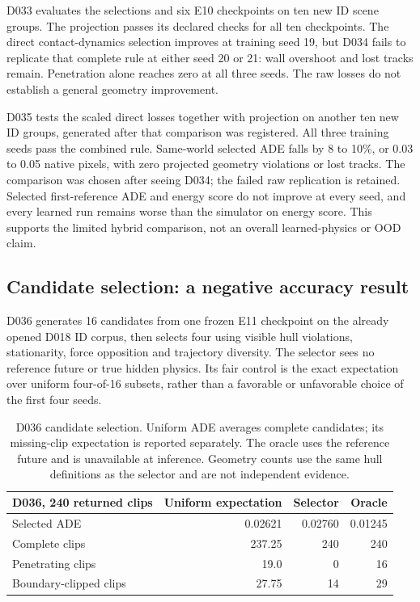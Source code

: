 D033 evaluates the selections and six E10 checkpoints on ten new ID scene
groups. The projection passes its declared checks for all ten checkpoints.
The direct contact-dynamics selection improves at training seed 19, but D034
fails to replicate that complete rule at either seed 20 or 21: wall overshoot
and lost tracks remain. Penetration alone reaches zero at all three seeds.
The raw losses do not establish a general geometry improvement.

D035 tests the scaled direct losses together with projection on another ten
new ID groups, generated after that comparison was registered. All three
training seeds pass the combined rule. Same-world selected ADE falls by
8 to 10\%, or 0.03 to 0.05 native pixels, with zero projected geometry violations
or lost tracks. The comparison was chosen after seeing D034; the failed raw
replication is retained. Selected first-reference ADE and energy score do not
improve at every seed, and every learned run remains worse than the simulator
on energy score. This supports the limited hybrid comparison, not an overall
learned-physics or OOD claim.

\subsection{Candidate selection: a negative accuracy result}
\label{sec:candidate-selection}
D036 generates 16 candidates from one frozen E11 checkpoint on the already
opened D018 ID corpus, then selects four using visible hull violations,
stationarity, force opposition and trajectory diversity. The selector sees no
reference future or true hidden physics. Its fair control is the exact
expectation over uniform four-of-16 subsets, rather than a favorable or
unfavorable choice of the first four seeds.

\begin{table}[!ht]
\centering
\begin{tabular}{lrrr}
\hline
D036, 240 returned clips & Uniform expectation & Selector & Oracle \\
\hline
Selected ADE & 0.02621 & 0.02760 & 0.01245 \\
Complete clips & 237.25 & 240 & 240 \\
Penetrating clips & 19.0 & 0 & 16 \\
Boundary-clipped clips & 27.75 & 14 & 29 \\
\hline
\end{tabular}
\caption{D036 candidate selection. Uniform ADE averages complete candidates;
its missing-clip expectation is reported separately. The oracle uses the
reference future and is unavailable at inference. Geometry counts use the
same hull definitions as the selector and are not independent evidence.}
\label{tab:selection-negative}
\end{table}

